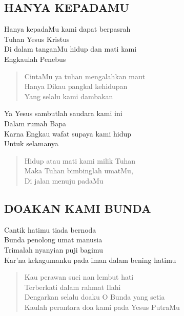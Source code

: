 \subsection{ HANYA KEPADAMU}
\begin{altverse}
Hanya kepadaMu kami dapat berpasrah\\
Tuhan Yesus Kristus\\
Di dalam tanganMu hidup dan mati kami\\
Engkaulah Penebus
\end{altverse}

\begin{verse}
CintaMu ya tuhan mengalahkan maut\\
Hanya Dikau pangkal kehidupan\\
Yang selalu kami dambakan
\end{verse}

\begin{altverse}
Ya Yesus sambutlah saudara kami ini\\
Dalam rumah Bapa\\
Karna Engkau wafat supaya kami hidup\\
Untuk selamanya
\end{altverse}

\begin{verse}
Hidup atau mati kami milik Tuhan\\
Maka Tuhan bimbinglah umatMu,\\ 
Di jalan menuju padaMu
\end{verse}

\subsection{ DOAKAN KAMI BUNDA}
\begin{altverse}
Cantik hatimu tiada bernoda\\
Bunda penolong umat manusia\\
Trimalah nyanyian puji bagimu\\
Kar’na kekagumanku pada iman dalam bening hatimu
\end{altverse}

\begin{verse}
Kau perawan suci nan lembut hati\\
Terberkati dalam rahmat Ilahi\\
Dengarkan selalu doaku O Bunda yang setia\\
Kaulah perantara doa kami pada Yesus PutraMu
\end{verse}


